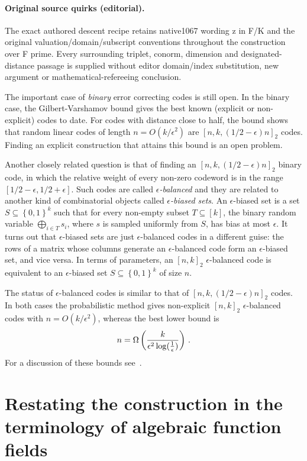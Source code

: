 \documentclass[10pt]{article}
\theoremstyle{definition}
\numberwithin{equation}{section}
\newcommand{\eps}{\epsilon}
\newcommand{\logeps}{\log({1 \over \epsilon})}
\newcommand{\set}[1]{{\left\{#1\right\}}}
\begin{document}
\paragraph{Original source quirks (editorial).} The exact authored descent recipe retains native1067 wording z in F/K and the original valuation/domain/subscript conventions throughout the construction over F prime. Every surrounding triplet, conorm, dimension and designated-distance passage is supplied without editor domain/index substitution, new argument or mathematical-refereeing conclusion.
\clearpage

The important case of \emph{binary} error correcting codes is still
open. In the binary case, the Gilbert-Varshamov bound gives the best
known (explicit or non-explicit) codes to date. For codes with
distance close to half, the bound shows that random linear codes
of length $n=O(k/\eps^2)$ are $[n,k,(1/2-\eps)n]_2$ codes. Finding
an explicit construction that attains this bound is an open problem.

Another closely related question is that of finding an
$[n,k,(1/2-\eps)n]_2$ binary code, in which the relative weight of
every non-zero codeword is in the range $[1/2-\eps,1/2+\eps]$.
Such codes are called \emph{$\eps$-balanced} and they are related to
another kind of combinatorial objects called \emph{$\eps$-biased
sets}. An $\eps$-biased set is a set $S \subseteq \set{0,1}^k$ such
that for every non-empty subset $T \subseteq [k]$, the binary random
variable $\bigoplus_{i \in T} s_i$, where $s$ is sampled uniformly
from $S$, has bias at most $\eps$. It turns out that $\eps$-biased
sets are just $\eps$-balanced codes in a different guise: the
%
%
rows of a matrix whose columns generate an $\eps$-balanced code form an $\eps$-biased set, and vice
versa. In terms of parameters, an $[n,k]_2$ $\eps$-balanced code is
equivalent to an $\eps$-biased set $S \subseteq \set{0,1}^k$ of size
$n$.

The status of $\eps$-balanced codes is similar to that of
$[n,k,(1/2-\eps)n]_2$ codes. In both cases the probabilistic
method gives non-explicit $[n,k]_2$ $\eps$-balanced codes with
$n=O({k / \eps^2})$, whereas the best lower bound is
\[
n=\Omega\left(\frac{k}{\eps^2 \logeps}\right)\,.
\] For a discussion of these
bounds see~\cite[Section 7]{AGHP:92}.
\setcounter{section}{2}
\section{Restating the construction in the terminology of algebraic function fields}
\label{sec:Restating}
\end{document}
